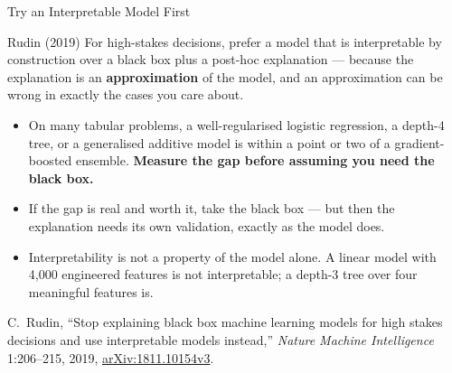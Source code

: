 \begin{frame}{Try an Interpretable Model First}

    \begin{block}{Rudin (2019)}
        For high-stakes decisions, prefer a model that is interpretable by construction over a
        black box plus a post-hoc explanation --- because the explanation is an
        \textbf{approximation} of the model, and an approximation can be wrong in exactly the cases
        you care about.
    \end{block}

    \vspace{0.8em}

    \begin{itemize}
        \setlength\itemsep{0.45em}
        \item On many tabular problems, a well-regularised logistic regression, a depth-4 tree, or
              a generalised additive model is within a point or two of a gradient-boosted ensemble.
              \textbf{Measure the gap before assuming you need the black box.}
        \item If the gap is real and worth it, take the black box --- but then the explanation
              needs its own validation, exactly as the model does.
        \item Interpretability is not a property of the model alone. A linear model with 4{,}000
              engineered features is not interpretable; a depth-3 tree over four meaningful
              features is.
    \end{itemize}

    \vspace{0.3em}
    {\scriptsize C.~Rudin, ``Stop explaining black box machine learning models for high stakes
    decisions and use interpretable models instead,'' \emph{Nature Machine Intelligence} 1:206--215,
    2019, \href{https://arxiv.org/abs/1811.10154v3}{arXiv:1811.10154v3}.}
\end{frame}

